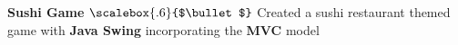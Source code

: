 


\newcommand\sbullet[1][.5]{\mathbin{\vcenter{\hbox{\scalebox{#1}{$\bullet$}}}}}

\textbf{Sushi Game} \hfill $\sbullet[.6]$ \hspace{1.5mm} Created a sushi restaurant themed game with \textbf{Java Swing} incorporating the \textbf{MVC} model
